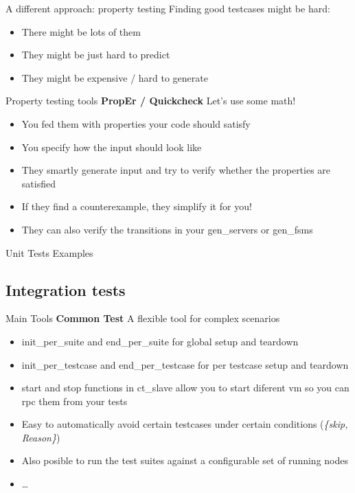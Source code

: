 \documentclass[]{beamer}
\begin{document}
\begin{frame}{A different approach: property testing}
    Finding good testcases might be hard:
    \begin{itemize}
    \item There might be lots of them
    \pause
    \item They might be just hard to predict
    \pause
    \item They might be expensive / hard to generate
    \end{itemize}
\end{frame}

\begin{frame}{Property testing tools}
    \textbf{PropEr / Quickcheck} Let's use some math!
    \begin{itemize}
    \pause
    \item You fed them with properties your code should satisfy
    \pause
    \item You specify how the input should look like
    \pause
    \item They smartly generate input and try to verify whether the properties are satisfied
    \pause
    \item If they find a counterexample, they simplify it for you!
    \pause
    \item They can also verify the transitions in your gen\_servers or gen\_fsms
    \end{itemize}
\end{frame}

\begin{frame}{Unit Tests Examples}
\end{frame}

\subsection*{Integration tests}
\label{integration_tests}

\begin{frame}{Main Tools}
    \textbf{Common Test} A flexible tool for complex scenarios
    \begin{itemize}
    \pause
    \item init\_per\_suite and end\_per\_suite for global setup and teardown
    \pause
    \item init\_per\_testcase and end\_per\_testcase for per testcase setup and teardown
    \pause
    \item start and stop functions in ct\_slave allow you to start diferent vm so you can rpc them from your tests
    \pause
    \item Easy to automatically avoid certain testcases under certain conditions (\emph{\{skip, Reason\}})
    \pause
    \item Also posible to run the test suites against a configurable set of running nodes
    \pause
    \item \dots
    \end{itemize}
\end{frame}
\end{document}
